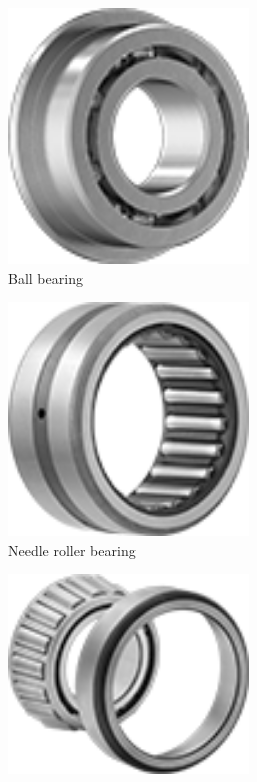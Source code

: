 \documentclass[10pt,letterpaper]{book}
\begin{document}
	\begin{figure}[H]
		\centering
		\begin{subfigure}[b]{.32\linewidth}
			\includegraphics[width=0.7\textwidth]{imgs/ballbearing.png}
			\caption{Ball bearing}
		\end{subfigure}
		\begin{subfigure}[b]{.32\linewidth}
			\includegraphics[width=0.7\textwidth]{imgs/needlebearing.png}
			\caption{Needle	 roller bearing}
		\end{subfigure}
		\begin{subfigure}[b]{.32\linewidth}
			\includegraphics[width=0.7\textwidth]{imgs/tnrbearing.png}

\end{subfigure}
\end{figure}
\end{document}
